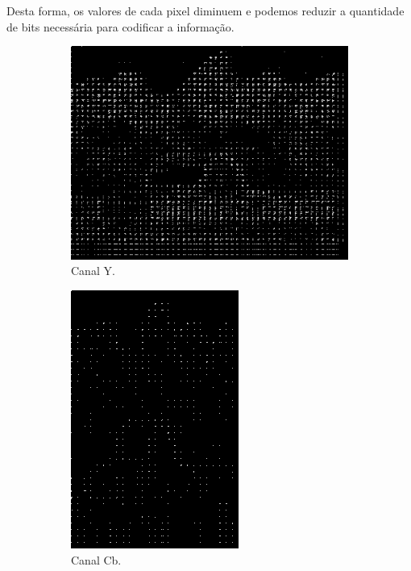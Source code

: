 \documentclass[a4paper, 12pt]{article}
\begin{document}
    Desta forma, os valores de cada pixel diminuem e podemos reduzir a quantidade de bits
    necessária para codificar a informação.
        \begin{figure}[H]
            \begin{subfigure}{0.3\textwidth}
                \centering
                \includegraphics[scale=0.5] {resources/DPCM/Y_DPCM10.png}
                \caption{ Canal Y.}
            \end{subfigure}
            \hfill
            \begin{subfigure}{0.3\textwidth}
                \centering 
                \includegraphics[scale=0.5]{resources/DPCM/CB_DPCM10.png}
                \caption{ Canal Cb.}
            \end{subfigure}
            \hfill
            \begin{subfigure}{0.3\textwidth}
                \centering

\end{subfigure}
\end{figure}
\end{document}
